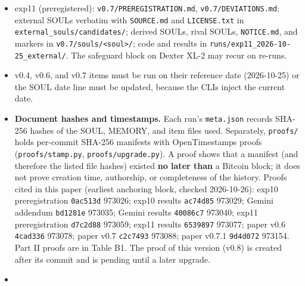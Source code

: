 \documentclass[10pt]{article}
\begin{document}
\begin{itemize}
\item
  exp11 (preregistered): \texttt{v0.\allowbreak{}7/\allowbreak{}PREREGISTRATION.\allowbreak{}md}, \texttt{v0.\allowbreak{}7/\allowbreak{}DEVIATIONS.\allowbreak{}md}; external SOULs verbatim with \texttt{SOURCE.\allowbreak{}md} and \texttt{LICENSE.\allowbreak{}txt} in \texttt{external\_\allowbreak{}souls/\allowbreak{}candidates/\allowbreak{}}; derived SOULs, rival SOULs, \texttt{NOTICE.\allowbreak{}md}, and markers in \texttt{v0.\allowbreak{}7/\allowbreak{}souls/\allowbreak{}\textless{}soul\textgreater{}/\allowbreak{}}; code and results in \texttt{runs/\allowbreak{}exp11\_\allowbreak{}2026-\allowbreak{}10-\allowbreak{}25\_\allowbreak{}external/\allowbreak{}}. The safeguard block on Dexter XL-2 may recur on re-runs.
\item
  v0.4, v0.6, and v0.7 items must be run on their reference date (2026-10-25) or the SOUL date line must be updated, because the CLIs inject the current date.
\item
  \textbf{Document hashes and timestamps.} Each run's \texttt{meta.\allowbreak{}json} records SHA-256 hashes of the SOUL, MEMORY, and item files used. Separately, \texttt{proofs/\allowbreak{}} holds per-commit SHA-256 manifests with OpenTimestamps proofs (\texttt{proofs/\allowbreak{}stamp.\allowbreak{}py}, \texttt{proofs/\allowbreak{}upgrade.\allowbreak{}py}). A proof shows that a manifest (and therefore the listed file hashes) existed \textbf{no later than} a Bitcoin block; it does not prove creation time, authorship, or completeness of the history. Proofs cited in this paper (earliest anchoring block, checked 2026-10-26): exp10 preregistration \texttt{0ac513d} 973026; exp10 results \texttt{ac74d85} 973029; Gemini addendum \texttt{bd1281e} 973035; Gemini results \texttt{40086c7} 973040; exp11 preregistration \texttt{d7c2d88} 973059; exp11 results \texttt{6539897} 973077; paper v0.6 \texttt{4cad336} 973078; paper v0.7 \texttt{c2c7493} 973088; paper v0.7.1 \texttt{9d4d072} 973154. Part II proofs are in Table B1. The proof of this version (v0.8) is created after its commit and is pending until a later upgrade.
\item

\end{itemize}
\end{document}
